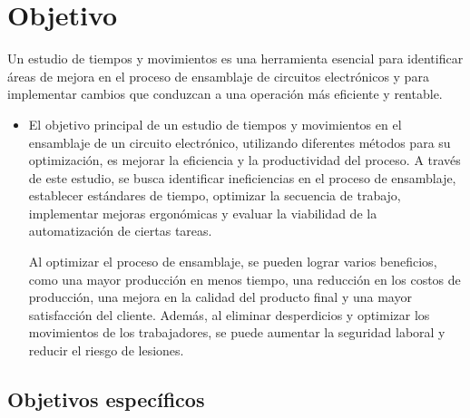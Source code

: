     \section{Objetivo}
    Un estudio de tiempos y movimientos es una herramienta esencial para identificar áreas de mejora en el proceso de ensamblaje de circuitos electrónicos y para implementar cambios que conduzcan a una operación más eficiente y rentable.
    
    \begin{itemize}
    
    \item El objetivo principal de un estudio de tiempos y movimientos en el ensamblaje de un circuito electrónico, utilizando diferentes métodos para su optimización, es mejorar la eficiencia y la productividad del proceso. A través de este estudio, se busca identificar ineficiencias en el proceso de ensamblaje, establecer estándares de tiempo, optimizar la secuencia de trabajo, implementar mejoras ergonómicas y evaluar la viabilidad de la automatización de ciertas tareas.
    
    Al optimizar el proceso de ensamblaje, se pueden lograr varios beneficios, como una mayor producción en menos tiempo, una reducción en los costos de producción, una mejora en la calidad del producto final y una mayor satisfacción del cliente. Además, al eliminar desperdicios y optimizar los movimientos de los trabajadores, se puede aumentar la seguridad laboral y reducir el riesgo de lesiones.\cite{Niebel2}
    
    \end{itemize}
    \subsection{Objetivos específicos }
    

